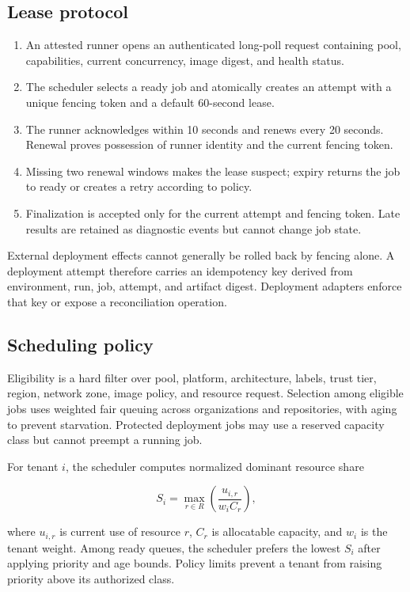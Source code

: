 \subsection{Lease protocol}

\begin{enumerate}
  \item An attested runner opens an authenticated long-poll request containing pool,
        capabilities, current concurrency, image digest, and health status.
  \item The scheduler selects a ready job and atomically creates an attempt with a unique
        fencing token and a default 60-second lease.
  \item The runner acknowledges within 10 seconds and renews every 20 seconds. Renewal
        proves possession of runner identity and the current fencing token.
  \item Missing two renewal windows makes the lease suspect; expiry returns the job to
        ready or creates a retry according to policy.
  \item Finalization is accepted only for the current attempt and fencing token. Late
        results are retained as diagnostic events but cannot change job state.
\end{enumerate}

External deployment effects cannot generally be rolled back by fencing alone. A
deployment attempt therefore carries an idempotency key derived from environment, run,
job, attempt, and artifact digest. Deployment adapters \must enforce that key or expose
a reconciliation operation.

\subsection{Scheduling policy}

Eligibility is a hard filter over pool, platform, architecture, labels, trust tier,
region, network zone, image policy, and resource request. Selection among eligible jobs
uses weighted fair queuing across organizations and repositories, with aging to prevent
starvation. Protected deployment jobs may use a reserved capacity class but cannot
preempt a running job.

For tenant $i$, the scheduler computes normalized dominant resource share

\[
  S_i = \max_{r \in R}\left(\frac{u_{i,r}}{w_i C_r}\right),
\]

where $u_{i,r}$ is current use of resource $r$, $C_r$ is allocatable capacity, and
$w_i$ is the tenant weight. Among ready queues, the scheduler prefers the lowest
$S_i$ after applying priority and age bounds. Policy limits prevent a tenant from
raising priority above its authorized class.

